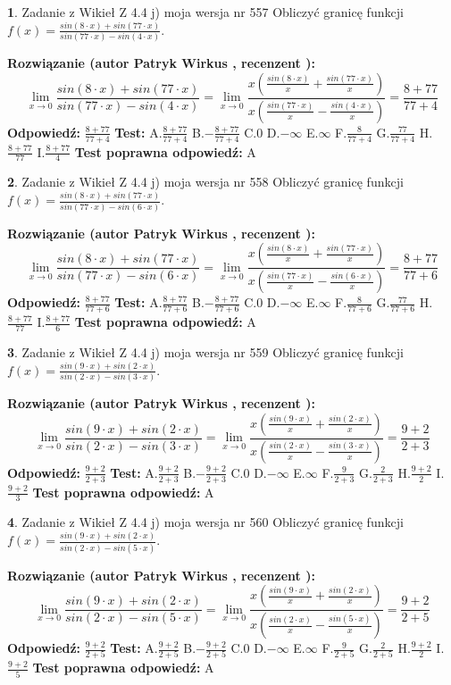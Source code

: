 \documentclass[12pt, a4paper]{article}
\theoremstyle{definition} %
\newtheorem{zad}{}
\newcommand{\zadStart}[1]{\begin{zad}#1\newline}
\newcommand{\zadStop}{\end{zad}}
\newcommand{\rozwStart}[2]{\noindent \textbf{Rozwiązanie (autor #1 , recenzent #2): }\newline}
\newcommand{\rozwStop}{\newline}
\newcommand{\odpStart}{\noindent \textbf{Odpowiedź:}\newline}
\newcommand{\odpStop}{\newline}
\newcommand{\testStart}{\noindent \textbf{Test:}\newline}
\newcommand{\testStop}{\newline}
\newcommand{\kluczStart}{\noindent \textbf{Test poprawna odpowiedź:}\newline}
\newcommand{\kluczStop}{\newline}
\begin{document}
\zadStart{Zadanie z Wikieł Z 4.4 j) moja wersja nr 557}
Obliczyć granicę funkcji $f(x)=\frac{sin(8\cdot x) +sin(77\cdot x)}{sin(77\cdot x) -sin(4\cdot x)}$.
\zadStop
\rozwStart{Patryk Wirkus}{}
$$\lim\limits_{x\to 0}\frac{sin(8\cdot x) +sin(77\cdot x)}{sin(77\cdot x) -sin(4\cdot x)}=\lim\limits_{x\to 0}\frac{x(\frac{sin(8\cdot x)}{x}+\frac{sin(77\cdot x)}{x})}{x(\frac{sin(77\cdot x)}{x}-\frac{sin(4\cdot x)}{x})}=\frac{8+77}{77+4}$$
\rozwStop
\odpStart
$\frac{8+77}{77+4}$
\odpStop
\testStart
A.$\frac{8+77}{77+4}$
B.$-\frac{8+77}{77+4}$
C.$0$
D.$-\infty$
E.$\infty$
F.$\frac{8}{77+4}$
G.$\frac{77}{77+4}$
H.$\frac{8+77}{77}$
I.$\frac{8+77}{4}$
\testStop
\kluczStart
A
\kluczStop



\zadStart{Zadanie z Wikieł Z 4.4 j) moja wersja nr 558}
Obliczyć granicę funkcji $f(x)=\frac{sin(8\cdot x) +sin(77\cdot x)}{sin(77\cdot x) -sin(6\cdot x)}$.
\zadStop
\rozwStart{Patryk Wirkus}{}
$$\lim\limits_{x\to 0}\frac{sin(8\cdot x) +sin(77\cdot x)}{sin(77\cdot x) -sin(6\cdot x)}=\lim\limits_{x\to 0}\frac{x(\frac{sin(8\cdot x)}{x}+\frac{sin(77\cdot x)}{x})}{x(\frac{sin(77\cdot x)}{x}-\frac{sin(6\cdot x)}{x})}=\frac{8+77}{77+6}$$
\rozwStop
\odpStart
$\frac{8+77}{77+6}$
\odpStop
\testStart
A.$\frac{8+77}{77+6}$
B.$-\frac{8+77}{77+6}$
C.$0$
D.$-\infty$
E.$\infty$
F.$\frac{8}{77+6}$
G.$\frac{77}{77+6}$
H.$\frac{8+77}{77}$
I.$\frac{8+77}{6}$
\testStop
\kluczStart
A
\kluczStop



\zadStart{Zadanie z Wikieł Z 4.4 j) moja wersja nr 559}
Obliczyć granicę funkcji $f(x)=\frac{sin(9\cdot x) +sin(2\cdot x)}{sin(2\cdot x) -sin(3\cdot x)}$.
\zadStop
\rozwStart{Patryk Wirkus}{}
$$\lim\limits_{x\to 0}\frac{sin(9\cdot x) +sin(2\cdot x)}{sin(2\cdot x) -sin(3\cdot x)}=\lim\limits_{x\to 0}\frac{x(\frac{sin(9\cdot x)}{x}+\frac{sin(2\cdot x)}{x})}{x(\frac{sin(2\cdot x)}{x}-\frac{sin(3\cdot x)}{x})}=\frac{9+2}{2+3}$$
\rozwStop
\odpStart
$\frac{9+2}{2+3}$
\odpStop
\testStart
A.$\frac{9+2}{2+3}$
B.$-\frac{9+2}{2+3}$
C.$0$
D.$-\infty$
E.$\infty$
F.$\frac{9}{2+3}$
G.$\frac{2}{2+3}$
H.$\frac{9+2}{2}$
I.$\frac{9+2}{3}$
\testStop
\kluczStart
A
\kluczStop



\zadStart{Zadanie z Wikieł Z 4.4 j) moja wersja nr 560}
Obliczyć granicę funkcji $f(x)=\frac{sin(9\cdot x) +sin(2\cdot x)}{sin(2\cdot x) -sin(5\cdot x)}$.
\zadStop
\rozwStart{Patryk Wirkus}{}
$$\lim\limits_{x\to 0}\frac{sin(9\cdot x) +sin(2\cdot x)}{sin(2\cdot x) -sin(5\cdot x)}=\lim\limits_{x\to 0}\frac{x(\frac{sin(9\cdot x)}{x}+\frac{sin(2\cdot x)}{x})}{x(\frac{sin(2\cdot x)}{x}-\frac{sin(5\cdot x)}{x})}=\frac{9+2}{2+5}$$
\rozwStop
\odpStart
$\frac{9+2}{2+5}$
\odpStop
\testStart
A.$\frac{9+2}{2+5}$
B.$-\frac{9+2}{2+5}$
C.$0$
D.$-\infty$
E.$\infty$
F.$\frac{9}{2+5}$
G.$\frac{2}{2+5}$
H.$\frac{9+2}{2}$
I.$\frac{9+2}{5}$
\testStop
\kluczStart
A
\kluczStop
\end{document}

